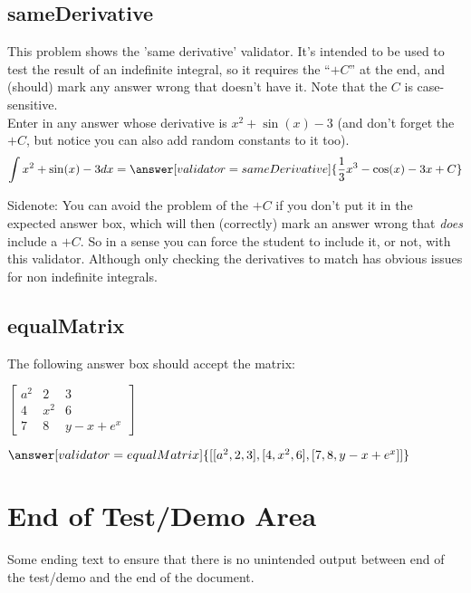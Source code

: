 \documentclass{ximera}
\begin{document}
    \subsection*{sameDerivative}

        \begin{problem}
            This problem shows the 'same derivative' validator. It's intended to be used to test the result of an indefinite integral, so it requires the ``$+C$'' at the end, and (should) mark any answer wrong that doesn't have it. Note that the $C$ is case-sensitive. \\
            
            Enter in any answer whose derivative is $x^2 + \sin(x) - 3$ (and don't forget the $+C$, but notice you can also add random constants to it too).
            \[
                \int x^2 + \sin(x) - 3 dx = \answer[validator=sameDerivative]{\frac{1}{3}x^3 - \cos(x) - 3x + C}
            \]
            
            Sidenote: You can avoid the problem of the $+C$ if you don't put it in the expected answer box, which will then (correctly) mark an answer wrong that \textit{does} include a $+C$. So in a sense you can force the student to include it, or not, with this validator. Although only checking the derivatives to match has obvious issues for non indefinite integrals.
        \end{problem}

    \subsection*{equalMatrix}
        \begin{problem}
            The following answer box should accept the matrix:
            
            $\left[\begin{matrix}
            a^2 & 2 & 3 \\
            4 & x^2 & 6 \\
            7 & 8 & y-x+e^x
            \end{matrix}\right]$
            
            $\answer[validator=equalMatrix]{[ [a^2,2,3], [4,x^2,6], [7,8,y-x+e^x] ]}$
        \end{problem}

\section{End of Test/Demo Area}

Some ending text to ensure that there is no unintended output between end of the test/demo and the end of the document.
\end{document}
